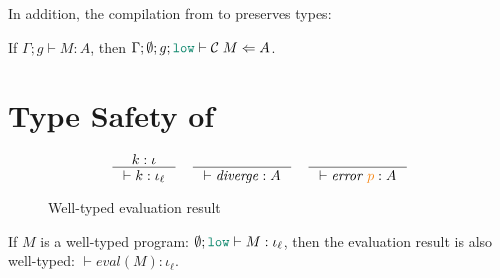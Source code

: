 In addition, the compilation from \Surface to \CC preserves types:

\begin{theorem}
  \label{thm:compile-pres}
  If $\Gamma ; g \vdash M : A$, then $\Gamma ; \emptyset ; g ; \low \vdash \compile{M} \Leftarrow A$.
\end{theorem}

\section{Type Safety of \Surface}
\label{sec:surface-type-safety}

\begin{figure}[tbp]
  \raggedright
  \begin{gather*}
    \inference{k : \iota}{\vdash k : \iota_{\ell}}
    \quad
    \inference{}{\vdash \mathit{diverge} : A}
    \quad
    \inference{}{\vdash \mathit{error}\;\bl{p} : A}
  \end{gather*}
  \caption{Well-typed evaluation result}
  \label{fig:wt-result}
\end{figure}

\begin{theorem}
  \label{thm:type-safety}
  If $M$ is a well-typed \Surface program: $\emptyset;\low \vdash M : \iota_{\ell}$,
  then the evaluation result is also well-typed: $\vdash \mathit{eval}(M) : \iota_{\ell}$.
\end{theorem}
